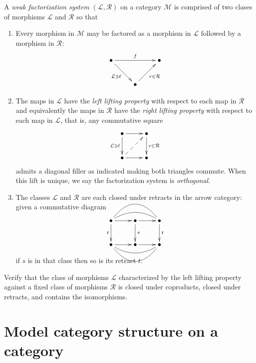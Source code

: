 \begin{definition}
\label{definition-weak-factorization-system}
A {\it weak factorization system
$(\mathcal{L},\mathcal{R})$} on a category
$\mathcal{M}$ is comprised of two clases of
morphisms $\mathcal{L}$
and $\mathcal{R}$ so that

\begin{enumerate}
\item Every morphism in $\mathcal{M}$ may be
factored as a morphism in $\mathcal{L}$
followed by a morphism in $\mathcal{R}$:
$$
\xymatrix{
\bullet\ar[rr]^{f}\ar[rd]_{\mathcal{L}
\ni\ell}
&& \bullet\\
& \bullet\ar[ru]_{r\in\mathcal{R}}
}
$$

\item The maps in $\mathcal{L}$ have the {\it
left lifting property} with respect to each
map in $\mathcal{R}$ and equivalently the
maps in $\mathcal{R}$ have the {\it right
lifting property} with respect to each map in
$\mathcal{L}$, that is, any commutative
square
$$
\xymatrix{
\bullet\ar[d]_{\mathcal{L}\ni\ell}\ar[r]
& \bullet\ar[d]^{r\in\mathcal{R}}\\
\bullet\ar@{-->}[ur]\ar[r]
& \bullet
}
$$
admits a diagonal filler as indicated making
both triangles commute.
When this lift is unique,
we say the factorization system is {\it
orthogonal}.

\item The classes $\mathcal{L}$ and
$\mathcal{R}$ are each closed under
retracts in the arrow category:
given a commutative diagram
$$
\xymatrix{
\bullet\ar[r]\ar[d]_{t}\ar@/^1pc/@{-}[rr]
\ar@/^2pc/@{-}[rr]
& \bullet\ar[r]\ar[d]^{s}
& \bullet\ar[d]^{t}\\
\bullet\ar[r]\ar@/_1pc/@{-}[rr]\ar@/_2pc/@{-}
[rr]
& \bullet\ar[r]
& \bullet
}
$$

\noindent
if $s$ is in that class then so is its
retract $t$.
\end{enumerate}
\end{definition}

\begin{exercise}[3.1.8, Riehl]
\label{exercise-3-1-8-rihel}
Verify that the class of morphisms
$\mathcal{L}$ characterized
by the left lifting property against a fixed
class of morphisms $\mathcal{R}$ is closed
under coproducts,
closed under retracts, and contains the
isomorphisms.
\end{exercise}

\section{Model category structure on a
category}
\label{section-model-category-structure}

